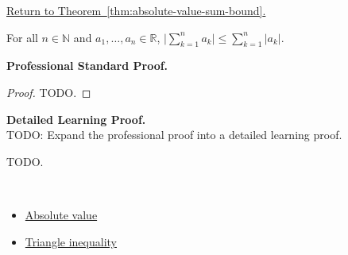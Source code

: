 \newpage
{}
\label{prf:absolute-value-sum-bound}

\begin{remark*}[Return]
\hyperref[thm:absolute-value-sum-bound]{Return to Theorem~\ref*{thm:absolute-value-sum-bound}.}
\end{remark*}

\begin{theorem*}
For all $n \in \mathbb{N}$ and $a_1, \ldots, a_n \in \mathbb{R}$,
$\lvert \sum_{k=1}^{n} a_k \rvert \le \sum_{k=1}^{n} \lvert a_k \rvert$.
\end{theorem*}

\textbf{Professional Standard Proof.}~\\
\begin{proof}
TODO.
\end{proof}

\textbf{Detailed Learning Proof.}~\\
TODO: Expand the professional proof into a detailed learning proof.


\begin{remark*}
TODO.
\end{remark*}

\begin{remark*}[Dependencies]~\\
\begin{itemize}
  \item \hyperref[def:absolute-value]{Absolute value}
  \item \hyperref[thm:triangle-inequality]{Triangle inequality}
\end{itemize}
\end{remark*}
